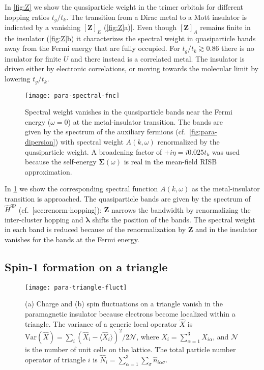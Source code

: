 \documentclass[reprint,aps,prb,amsmath,amssymb]{revtex4-2}
\begin{document}
In \cref{fig:Z} we show the quasiparticle weight in the trimer orbitals for different hopping ratios $t_g/t_k$. The transition from a Dirac metal to a Mott insulator is indicated by a vanishing $[\bm{Z}]_E$ (\cref{fig:Z}a)]. Even though $[\bm{Z}]_A$ remains finite in the insulator (\cref{fig:Z}b) it characterizes the spectral weight in quasiparticle bands away from the Fermi energy that are fully occupied. For $t_g/t_k \gtrsim 0.86$ there is no insulator for finite $U$ and there instead is a correlated metal. The insulator is driven either by electronic correlations, or moving towards the molecular limit by lowering $t_g/t_k$. 

\begin{figure}
	\centering
	\texttt{[image: para-spectral-fnc]}
	\caption{\label{fig:para-spectral-fnc}
	Spectral weight vanishes in the quasiparticle bands near the Fermi energy ($\omega = 0$) at the metal-insulator transition. The bands are given by the spectrum of the auxiliary fermions (cf.~\cref{fig:para-dipersion}) with spectral weight $A(k,\omega)$ renormalized by the quasiparticle weight. A broadening factor of $+i\eta = i0.025t_k$ was used because the self-energy $\bm{\Sigma}(\omega)$ is real in the mean-field RISB approximation.
	}
\end{figure}

In \cref{fig:para-spectral-fnc} we show the corresponding spectral function $A(k,\omega)$ as the metal-insulator transition is approached. The quasiparticle bands are given by the spectrum of $\hat{H}^{\mathrm{qp}}$ (cf.~\cref{sec:renorm-hopping}): $\bm{Z}$ narrows the bandwidth by renormalizing the inter-cluster hopping and $\bm{\lambda}$ shifts the position of the bands. The spectral weight in each band is reduced because of the renormalization by $\bm{Z}$ and in the insulator vanishes for the bands at the Fermi energy. 

\subsection{Spin-1 formation on a triangle}

\begin{figure}
	\centering
	\texttt{[image: para-triangle-fluct]}
	\caption{\label{fig:para-triangle-fluct}
		(a) Charge and (b) spin fluctuations on a triangle vanish in the paramagnetic insulator because electrons become localized within a triangle. The variance of a generic local operator $\hat{X}$ is $\mathrm{Var}(\hat{X}) = \sum_i (\hat{X}_i - \langle \hat{X}_i \rangle)^2 / 2 \mathcal{N}$, where $\hat{X}_i = \sum_{\alpha=1}^3 \hat{X}_{i\alpha}$, and $\mathcal{N}$ is the number of unit cells on the lattice. The total particle number operator of triangle $i$ is $\hat{N}_i = \sum_{\alpha=1}^3 \sum_{\sigma} \hat{n}_{i\alpha\sigma}$.
	}
\end{figure}
\end{document}
